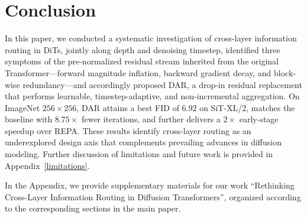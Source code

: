 \documentclass{llmxive}
\begin{document}
\section{Conclusion}  \label{sec:conclusions}
In this paper, we conducted a systematic investigation of cross-layer information routing in DiTs, jointly along depth and denoising timestep, identified three symptoms of the pre-normalized residual stream inherited from the original Transformer---forward magnitude inflation, backward gradient decay, and block-wise redundancy---and accordingly proposed \textsc{DAR}, a drop-in residual replacement that performs learnable, timestep-adaptive, and non-incremental aggregation. On ImageNet $256{\times}256$, \textsc{DAR} attains a best FID of $6.92$ on SiT-XL/2, matches the baseline with $8.75\times$ fewer iterations, and further delivers a $2\times$ early-stage speedup over REPA. These results identify cross-layer routing as an underexplored design axis that complements prevailing advances in diffusion modeling. Further discussion of limitations and future work is provided in Appendix~\ref{limitations}.










\appendix
\noindent In the Appendix, we provide supplementary materials for our work ``Rethinking Cross-Layer Information Routing in
Diffusion Transformers'', organized according to the corresponding sections in the main paper.
\end{document}
